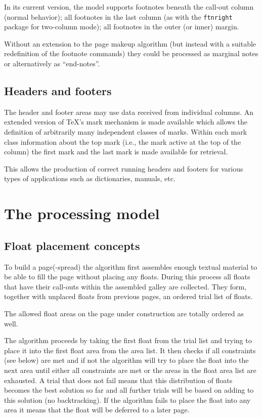 \documentclass[twocolumn]{article}
\begin{document}
In its current version, the model supports footnotes beneath the
call-out column (normal behavior); all footnotes in the last column
(as with the \texttt{ftnright} package for two-column mode); all
footnotes in the outer (or inner) margin. 

Without an extension to the page makeup algorithm (but instead with a
suitable redefinition of the footnote commands) they could be processed
as marginal notes or alternatively as ``end-notes''.


\subsection{Headers and footers}

The header and footer areas may use data received from individual
columns. An extended version of \TeX's mark mechanism is made
available which allows the definition of arbitrarily many independent
classes of marks. Within each mark class information about the top
mark (i.e., the mark active at the top of the column) the first mark
and the last mark is made available for retrieval.

This allows the production of correct running headers and footers for
various types of applications such as dictionaries, manuals, etc.



\section{The processing model}

\subsection{Float placement concepts}\label{sec:float-place}

To build a page(-spread) the algorithm first assembles enough textual
material to be able to fill the page without placing any floats.
During this process all floats that have their call-outs within the
assembled galley are collected. They form, together with unplaced
floats from previous pages, an ordered trial list of floats.

The allowed float areas on the page under construction are totally
ordered as well.

The algorithm proceeds by taking the first float from the trial list
and trying to place it into the first float area from the area
list. It then checks if all constraints (see below) are met and if not
the algorithm
will try to place the float into the next area until either all
constraints are met or the areas in the float area list are exhausted.
A trial that does not fail means that
this distribution of floats becomes the best solution so far and all
further trials will be based on adding to this solution (no
backtracking). If the algorithm fails to place the float into any
area it means that the float will be deferred to a later page.
\end{document}
